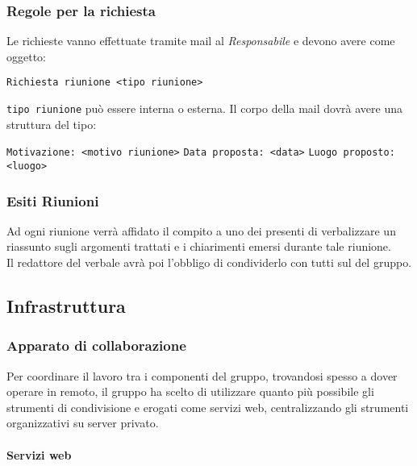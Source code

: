 \documentclass{scalatekids-article}
\begin{document}
\subsubsection{Regole per la richiesta}

\label{sec:RegoleRichiesta}
Le richieste vanno effettuate tramite mail al \textit{Responsabile} e devono avere come oggetto:
\begin{center}
    \verb=Richiesta riunione <tipo riunione>=
\end{center}
\verb=tipo riunione= può essere interna o esterna.
Il corpo della mail dovrà avere una struttura del tipo:
\begin{center}
    \verb=Motivazione: <motivo riunione>=
    \verb=Data proposta: <data>=
    \verb=Luogo proposto: <luogo>=
\end{center}

\subsubsection{Esiti Riunioni}

Ad ogni riunione verrà affidato il compito a uno dei presenti di verbalizzare un riassunto sugli argomenti trattati e i chiarimenti emersi durante tale riunione.\\
Il redattore del verbale avrà poi l'obbligo di condividerlo con tutti sul  del gruppo.

\subsection{Infrastruttura}

\subsubsection{Apparato di collaborazione}

Per coordinare il lavoro tra i componenti del gruppo, trovandosi spesso a dover
operare in remoto, il gruppo ha scelto di utilizzare quanto più possibile gli
strumenti di condivisione e  erogati come servizi web,
centralizzando gli strumenti organizzativi su server privato.

\paragraph{Servizi web}
\end{document}
